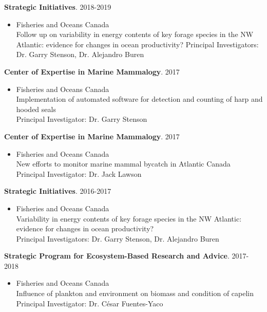 \documentclass{res}
\begin{document}
\begin{resume}
\pagebreak

\textbf{Strategic Initiatives}. 2018-2019
\begin{itemize} %
	\item[] Fisheries and Oceans Canada\\
Follow up on variability in energy contents of key forage species in the NW Atlantic: evidence for changes in ocean productivity?
Principal Investigators: Dr. Garry Stenson, Dr. Alejandro Buren
\end{itemize}

\textbf{Center of Expertise in Marine Mammalogy}. 2017
\begin{itemize} %
	\item[] Fisheries and Oceans Canada\\
Implementation of automated software for detection and counting of harp and hooded seals \\
Principal Investigator: Dr. Garry Stenson
\end{itemize}

\textbf{Center of Expertise in Marine Mammalogy}. 2017
\begin{itemize} %
	\item[] Fisheries and Oceans Canada\\
New efforts to monitor marine mammal bycatch in Atlantic Canada\\
Principal Investigator: Dr. Jack Lawson
\end{itemize}

\textbf{Strategic Initiatives}. 2016-2017
\begin{itemize} %
	\item[]Fisheries and Oceans Canada\\
Variability in energy contents of key forage species in the NW Atlantic: evidence for changes in ocean productivity?\\
Principal Investigators: Dr. Garry Stenson, Dr. Alejandro Buren
\end{itemize}

\textbf{Strategic Program for Ecosystem-Based Research and Advice}. 2017-2018
\begin{itemize} %
	\item[]Fisheries and Oceans Canada\\
Influence of plankton and environment on biomass and condition of capelin\\
Principal Investigator: Dr. César Fuentes-Yaco
\end{itemize}


\end{resume}
\end{document}
